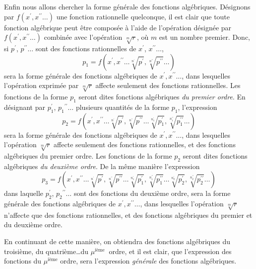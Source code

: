 \documentclass[oneside, 12 pt, leqno]{memoir}
\begin{document}
Enfin nous allons chercher la forme générale des fonctions algébriques. Désignons par \(f(x^{\prime}, x^{\prime \prime} \dots)\) une fonction rationnelle quelconque, il est clair que toute fonction algébrique peut être composée à l'aide de l'opération désignée par \(f(x^{\prime}, x^{\prime \prime} \dots)\) combinée avec l'opération \(\sqrt[m]{r}\), où \(m\) est un nombre premier. Donc, si \(p^{\prime}\), \(p^{\prime \prime} \dots\) sont des fonctions rationnelles de \(x^{\prime}\), \(x^{\prime \prime} \dots\),
\[p_1=f\left(x^{\prime}, x^{\prime \prime} \dots \sqrt[n^{\prime}]{p^{\prime}}, \sqrt[n^{\prime\prime}]{p^{\prime \prime}} \dots\right)\]
sera la forme générale des fonctions algébriques de \(x^{\prime}, x^{\prime \prime} \dots\), dans lesquelles l'opération exprimée par \(\sqrt[m]{r}\) affecte seulement des fonctions rationnelles. Les fonctions de la forme \(p_1\) seront dites fonctions algébriques \textit{du premier ordre}. En désignant par \(p_1^{\prime}\), \(p_1{ }^{\prime \prime} \dots\) plusieurs quantités de la forme \(p_1\), l'expression
\[p_2=f\left(x^{\prime}, x^{\prime \prime} \dots \sqrt[n^{\prime}]{p^{\prime}}, \sqrt[n^{\prime \prime}]{p^{\prime \prime}} \dots \sqrt[n_1^{\prime}]{p_1^{\prime}}, \sqrt[n_1^{\prime \prime}]{p_1^{\prime \prime}} \dots\right)\]
sera la forme générale des fonctions algébriques de \(x^{\prime}, x^{\prime \prime} \dots\), dans lesquelles l'opération \(\sqrt[m]{r}\) affecte seulement des fonctions rationnelles, et des fonctions algébriques du premier ordre. Les fonctions de la forme \(p_2\) seront dites fonctions algébriques \textit{du deuxième ordre}. De la même manière l'expression
\[p_3 = f\left(x^{\prime}, x^{\prime \prime} \dots \sqrt[n^{\prime}]{p^{\prime}},\sqrt[n^{\prime \prime}]{p^{\prime \prime}} \dots \sqrt[n_1^{\prime}]{p_1^{\prime}},\sqrt[n_1^{\prime \prime}]{p_1^{\prime \prime}} \dots \sqrt[n_2^{\prime}]{p_2^{\prime}},\sqrt[n_2^{\prime \prime}]{p_2^{\prime \prime}} \dots \right) \] 
dans laquelle \(p_2^{\prime}\), \(p_2{ }^{\prime \prime} \dots\) sont des fonctions du deuxième ordre, sera la forme générale des fonctions algébriques de \(x^{\prime}, x^{\prime \prime} \dots\), dans lesquelles l'opération \(\sqrt[m]{r}\) n'affecte que des fonctions rationnelles, et des fonctions algébriques du premier et du deuxième ordre.

En continuant de cette manière, on obtiendra des fonctions algébriques du troisième, du quatrième\dots du \(\mu^{\text {ième }}\) ordre, et il est clair, que l'expression des fonctions du \(\mu^{\text{ième}}\) ordre, sera l'expression \textit{générale} des fonctions algébriques.
\end{document}
